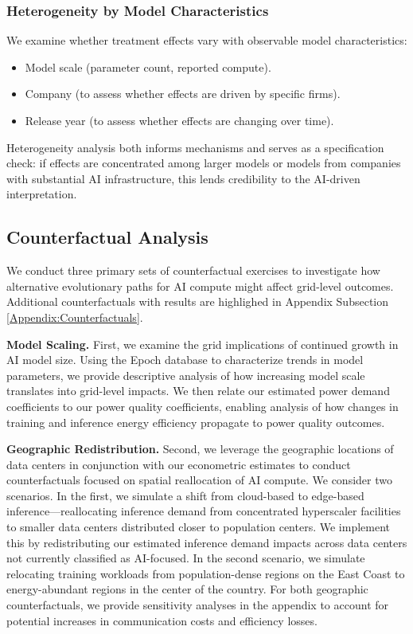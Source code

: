 \documentclass[sigconf]{acmart}
\begin{document}
\subsubsection{Heterogeneity by Model Characteristics}

We examine whether treatment effects vary with observable model characteristics:
\begin{itemize}
    \item Model scale (parameter count, reported compute).
    \item Company (to assess whether effects are driven by specific firms).
    \item Release year (to assess whether effects are changing over time).
\end{itemize}
Heterogeneity analysis both informs mechanisms and serves as a specification check: if effects are concentrated among larger models or models from companies with substantial AI infrastructure, this lends credibility to the AI-driven interpretation.
\subsection{Counterfactual Analysis}\label{counterfactuals}%

We conduct three primary sets of counterfactual exercises to investigate how alternative evolutionary paths for AI compute might affect grid-level outcomes. Additional counterfactuals with results are highlighed in Appendix Subsection \ref{Appendix:Counterfactuals}.

\textbf{Model Scaling.} First, we examine the grid implications of continued growth in AI model size. Using the Epoch database to characterize trends in model parameters, we provide descriptive analysis of how increasing model scale translates into grid-level impacts. We then relate our estimated power demand coefficients to our power quality coefficients, enabling analysis of how changes in training and inference energy efficiency propagate to power quality outcomes.

\textbf{Geographic Redistribution.} Second, we leverage the geographic locations of data centers in conjunction with our econometric estimates to conduct counterfactuals focused on spatial reallocation of AI compute. We consider two scenarios. In the first, we simulate a shift from cloud-based to edge-based inference—reallocating inference demand from concentrated hyperscaler facilities to smaller data centers distributed closer to population centers. We implement this by redistributing our estimated inference demand impacts across data centers not currently classified as AI-focused. In the second scenario, we simulate relocating training workloads from population-dense regions on the East Coast to energy-abundant regions in the center of the country. For both geographic counterfactuals, we provide sensitivity analyses in the appendix to account for potential increases in communication costs and efficiency losses.
\end{document}
